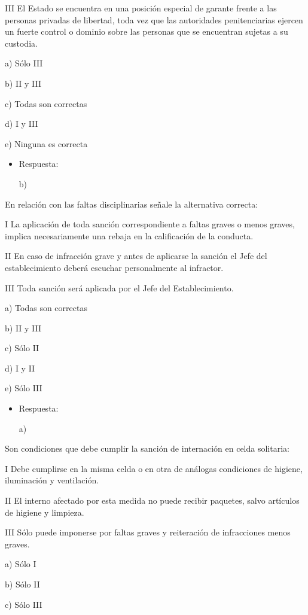 \documentclass[letterpaper, 11pt]{article}
\begin{document}
III El Estado se encuentra en una posición especial de garante frente
a las personas privadas de libertad, toda vez que las autoridades
penitenciarias ejercen un fuerte control o dominio sobre las personas
que se encuentran sujetas a su custodia.


a) Sólo III

b) II y III

c) Todas son correctas

d) I y III

e) Ninguna es correcta

\begin{itemize}
\item Respuesta:

b)
\end{itemize}


En relación con las faltas disciplinarias señale la alternativa
correcta:

I La aplicación de toda sanción correspondiente a faltas graves o
menos graves, implica necesariamente una rebaja en la calificación de
la conducta.

II En caso de infracción grave y antes de aplicarse la sanción el Jefe
del establecimiento deberá escuchar personalmente al infractor.

III Toda sanción será aplicada por el Jefe del Establecimiento.


a) Todas son correctas

b) II y III

c) Sólo II

d) I y II

e) Sólo III

\begin{itemize}
\item Respuesta:

a)
\end{itemize}


Son condiciones que debe cumplir la sanción de internación en celda
solitaria:

I Debe cumplirse en la misma celda o en otra de análogas condiciones
de higiene, iluminación y ventilación.

II El interno afectado por esta medida no puede recibir paquetes,
salvo artículos de higiene y limpieza.

III Sólo puede imponerse por faltas graves y reiteración de
infracciones menos graves.


a) Sólo I

b) Sólo II

c) Sólo III
\end{document}
